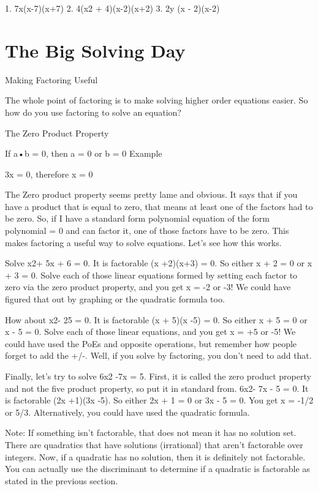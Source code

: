 1. 7x(x-7)(x+7)
2. 4(x2 + 4)(x-2)(x+2)
3. 2y (x - 2)(x-2)

\section{The Big Solving Day}

Making Factoring Useful

The whole point of factoring is to make solving higher order equations easier. So how do you use factoring to solve an equation?

The Zero Product Property

If a•b = 0, then a = 0 or b = 0 
Example

3x = 0, therefore x = 0

The Zero product property seems pretty lame and obvious. It says that if you have a product that is equal to zero, that means at least one of the factors had to be zero. So, if I have a standard form polynomial equation of the form polynomial = 0 and can factor it, one of those factors have to be zero. This makes factoring a useful way to solve equations. Let's see how this works.

Solve x2+ 5x + 6 = 0. It is factorable (x +2)(x+3) = 0. So either x + 2 = 0 or x + 3 = 0. Solve each of those linear equations formed by setting each factor to zero via the zero product property, and you get x = -2 or -3! We could have figured that out by graphing or the quadratic formula too.

How about x2- 25 = 0. It is factorable (x + 5)(x -5) = 0. So either x + 5 = 0 or x - 5 = 0. Solve each of those linear equations, and you get x = +5 or -5! We could have used the PoEs and opposite operations, but remember how people forget to add the +/-. Well, if you solve by factoring, you don't need to add that.

Finally, let's try to solve 6x2 -7x = 5. First, it is called the zero product property and not the five product property, so put it in standard from. 6x2- 7x - 5 = 0. It is factorable (2x +1)(3x -5). So either 2x + 1 = 0 or 3x - 5 = 0. You get x = -1/2 or 5/3. Alternatively, you could have used the quadratic formula.

Note: If something isn't factorable, that does not mean it has no solution set. There are quadratics that have solutions (irrational) that aren't factorable over integers. Now, if a quadratic has no solution, then it is definitely not factorable. You can actually use the discriminant to determine if a quadratic is factorable as stated in the previous section.

